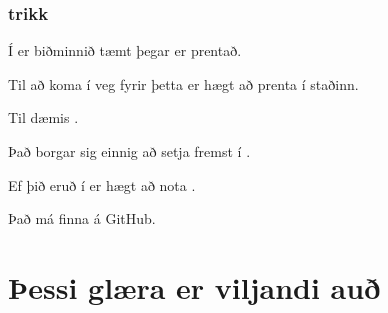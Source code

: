 {
    \frametitle{ trikk}
    {
        \item<1-> Í  er biðminnið tæmt þegar  er prentað.
        \item<2-> Til að koma í veg fyrir þetta er hægt að prenta  í staðinn.
        \item<3-> Til dæmis .
        \item<4-> Það borgar sig einnig að setja  fremst í .
        \item<5-> Ef þið eruð í  er hægt að nota .
        \item<6-> Það má finna á GitHub.
    }
}

\section{Þessi glæra er viljandi auð}
{
}


